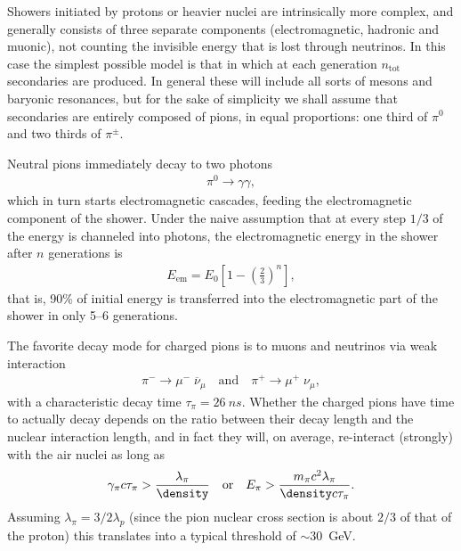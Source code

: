 Showers initiated by protons or heavier nuclei are intrinsically more complex,
and generally consists of three separate components (electromagnetic, hadronic
and muonic), not counting the invisible energy that is lost through neutrinos.
In this case the simplest possible model is that in which at each generation
$n_\text{tot}$ secondaries
are produced. In general these will include all sorts
of mesons and baryonic resonances, but for the sake of simplicity we shall assume
that secondaries are entirely composed of pions, in equal proportions: one third
of $\pi^0$ and two thirds of $\pi^\pm$.

Neutral pions immediately decay to two photons
\begin{align*}
  \pi^0 \rightarrow \gamma \gamma,
\end{align*}
which in turn starts electromagnetic cascades, feeding the electromagnetic component
of the shower. Under the naive assumption that at every step $1/3$ of the energy
is channeled into photons, the electromagnetic energy in the shower after $n$
generations is
\begin{align}
  E_\text{em} = E_0 \left[ 1 - \left( \frac{2}{3} \right)^n \right],
\end{align}
that is, 90\% of initial energy is transferred into the electromagnetic part of the
shower in only 5--6 generations.

The favorite decay mode for charged pions is to muons and neutrinos via weak interaction
\begin{align*}
  \pi^- \rightarrow \mu^- \; \overline{\nu}_\mu
  \quad\text{and}\quad
  \pi^+ \rightarrow \mu^+ \; \nu_\mu,
\end{align*}
with a characteristic decay time $\tau_\pi = 26~ns$. Whether the charged pions
have time to actually decay depends on the ratio between their decay length and
the nuclear interaction length, and in fact they will, on average, re-interact
(strongly) with the air nuclei as long as
\begin{align*}
  \gamma_\pi c \tau_\pi > \frac{\lambda_\pi}{\density}
  \quad\text{or}\quad
  E_\pi > \frac{m_\pi c^2 \lambda_\pi}{\density c\tau_\pi}.
\end{align*}
Assuming $\lambda_\pi = 3/2 \lambda_p$ (since the pion nuclear cross section is
about $2/3$ of that of the proton) this translates into a typical threshold of
$\sim 30$~GeV.

